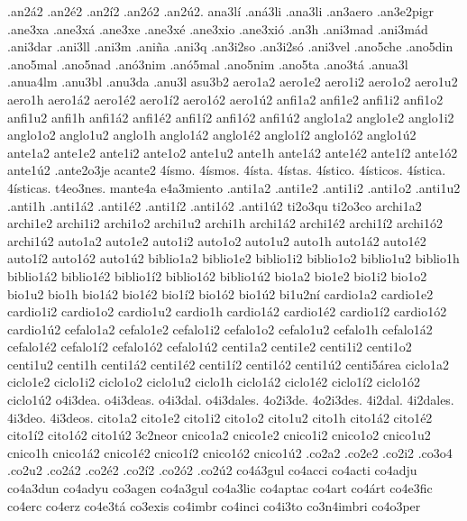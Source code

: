 {.an2^^e12 .an2^^e92 .an2^^ed2 .an2^^f32 .an2^^fa2.
ana3l^^ed
.an^^e13li
.ana3li
.an3aero
.an3e2pigr
.ane3xa .ane3x^^e1 .ane3xe .ane3x^^e9 .ane3xio .ane3xi^^f3
.an3h
.ani3mad .ani3m^^e1d
.ani3dar
.ani3ll
.ani3m
.ani^^f1a
.ani3q
.an3i2so .an3i2s^^f3
.ani3vel
.ano5che
.ano5din
.ano5mal
.ano5nad
.an^^f33nim
.an^^f35mal
.ano5nim
.ano5ta .ano3t^^e1
.anua3l
.anua4lm
.anu3bl
.anu3da
.anu3l
asu3b2
aero1a2 aero1e2 aero1i2 aero1o2 aero1u2 aero1h
aero1^^e12 aero1^^e92 aero1^^ed2 aero1^^f32 aero1^^fa2
anfi1a2 anfi1e2 anfi1i2 anfi1o2 anfi1u2 anfi1h
anfi1^^e12 anfi1^^e92 anfi1^^ed2 anfi1^^f32 anfi1^^fa2
anglo1a2 anglo1e2 anglo1i2 anglo1o2 anglo1u2 anglo1h
anglo1^^e12 anglo1^^e92 anglo1^^ed2 anglo1^^f32 anglo1^^fa2
ante1a2 ante1e2 ante1i2 ante1o2 ante1u2 ante1h
ante1^^e12 ante1^^e92 ante1^^ed2 ante1^^f32 ante1^^fa2
.ante2o3je
acante2
4^^edsmo. 4^^edsmos. 4^^edsta. 4^^edstas.
4^^edstico. 4^^edsticos. 4^^edstica. 4^^edsticas.
t4eo3nes.
mante4a
e4a3miento
.anti1a2 .anti1e2 .anti1i2 .anti1o2 .anti1u2 .anti1h
.anti1^^e12 .anti1^^e92 .anti1^^ed2 .anti1^^f32 .anti1^^fa2
ti2o3qu ti2o3co
archi1a2 archi1e2 archi1i2 archi1o2 archi1u2 archi1h
archi1^^e12 archi1^^e92 archi1^^ed2 archi1^^f32 archi1^^fa2
auto1a2 auto1e2 auto1i2 auto1o2 auto1u2 auto1h
auto1^^e12 auto1^^e92 auto1^^ed2 auto1^^f32 auto1^^fa2
biblio1a2 biblio1e2 biblio1i2 biblio1o2 biblio1u2 biblio1h
biblio1^^e12 biblio1^^e92 biblio1^^ed2 biblio1^^f32 biblio1^^fa2
bio1a2 bio1e2 bio1i2 bio1o2 bio1u2 bio1h
bio1^^e12 bio1^^e92 bio1^^ed2 bio1^^f32 bio1^^fa2
bi1u2n^^ed
cardio1a2 cardio1e2 cardio1i2 cardio1o2 cardio1u2 cardio1h
cardio1^^e12 cardio1^^e92 cardio1^^ed2 cardio1^^f32 cardio1^^fa2
cefalo1a2 cefalo1e2 cefalo1i2 cefalo1o2 cefalo1u2 cefalo1h
cefalo1^^e12 cefalo1^^e92 cefalo1^^ed2 cefalo1^^f32 cefalo1^^fa2
centi1a2 centi1e2 centi1i2 centi1o2 centi1u2 centi1h
centi1^^e12 centi1^^e92 centi1^^ed2 centi1^^f32 centi1^^fa2
centi5^^e1rea
ciclo1a2 ciclo1e2 ciclo1i2 ciclo1o2 ciclo1u2 ciclo1h
ciclo1^^e12 ciclo1^^e92 ciclo1^^ed2 ciclo1^^f32 ciclo1^^fa2
o4i3dea. o4i3deas. o4i3dal. o4i3dales.
4o2i3de. 4o2i3des. 4i2dal. 4i2dales.
4i3deo. 4i3deos.
cito1a2 cito1e2 cito1i2 cito1o2 cito1u2 cito1h
cito1^^e12 cito1^^e92 cito1^^ed2 cito1^^f32 cito1^^fa2
3c2neor
cnico1a2 cnico1e2 cnico1i2 cnico1o2 cnico1u2 cnico1h
cnico1^^e12 cnico1^^e92 cnico1^^ed2 cnico1^^f32 cnico1^^fa2
.co2a2 .co2e2 .co2i2 .co3o4 .co2u2 .co2^^e12 .co2^^e92 .co2^^ed2 .co2^^f32 .co2^^fa2
co4^^e13gul
co4acci
co4acti
co4adju
co4a3dun
co4adyu
co3agen
co4a3gul
co4a3lic
co4aptac
co4art
co4^^e1rt
co4e3fic
co4erc
co4erz
co4e3t^^e1
co3exis
co4imbr
co4inci
co4i3to
co3n4imbri
co4o3per
}

